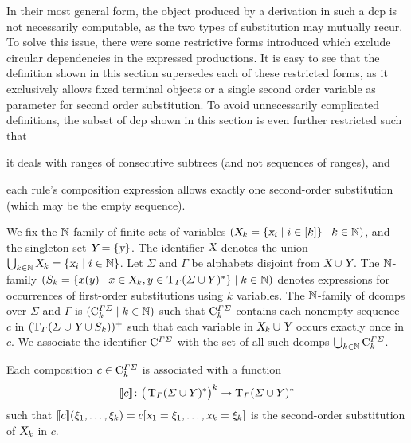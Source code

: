 \documentclass[../document.tex]{subfiles}
\begin{document}
    In their most general form, the object produced by a derivation in such a \gls{dcp} is not necessarily computable, as the two types of substitution may mutually recur.
    To solve this issue, there were some restrictive forms introduced which exclude circular dependencies in the expressed productions. \cite{???}
    It is easy to see that the definition shown in this section supersedes each of these restricted forms, as it exclusively allows fixed terminal objects or a single second order variable as parameter for second order substitution.
    To avoid unnecessarily complicated definitions, the subset of \gls{dcp} shown in this section is even further restricted such that
    \begin{inparaenum}
        \item it deals with ranges of consecutive subtrees (and not sequences of ranges), and
        \item each rule's composition expression allows exactly one second-order substitution (which may be the empty sequence).
    \end{inparaenum}

    \begin{definition}[Composition]
        We fix the \(\mathbb{N}\)-\gls{family} of finite sets of variables \((\textsl{X}_k = \{\textsl{x}_i \mid i \in [k]\} \mid k \in \mathbb{N})\), and the singleton set \(\textsl{Y} = \{\textsl{y}\}\).
        The identifier \(\textsl{X}\) denotes the union \(\bigcup_{k \in \mathbb{N}} \textsl{X}_k = \{\textsl{x}_i \mid i \in \mathbb{N}\}\).
        Let \(\varSigma\) and \(\varGamma\) be alphabets disjoint from \(\textsl{X} \cup \textsl{Y}\).
        The \(\mathbb{N}\)-\gls{family} \((S_k = \{x(y) \mid x \in \textsl{X}_k, y \in \operatorname{T}_\varGamma(\varSigma \cup Y)^*\} \mid k \in \mathbb{N})\) denotes expressions for occurrences of first-order substitutions using \(k\) variables.
        The \(\mathbb{N}\)-\gls{family} of \glspl{dcomp} over \(\varSigma\) and \(\varGamma\) is \((\mathrm{C}^{\varGamma\varSigma}_k \mid k \in \mathbb{N})\) such that \(\mathrm{C}^{\varGamma\varSigma}_k\) contains each nonempty sequence \(c\) in \((\operatorname{T}_\varGamma(\varSigma \cup \textsl{Y} \cup S_k))^+\) such that each variable in \(\textsl{X}_k \cup \textsl{Y}\) occurs exactly once in \(c\).
        We associate the identifier \(\mathrm{C}^{\varGamma\varSigma}\) with the set of all such \glspl*{dcomp} \(\bigcup_{k \in \mathbb{N}} \mathrm{C}^{\varGamma\varSigma}_{k}\).

        Each composition \(c \in \mathrm{C}^{\varGamma\varSigma}_k\) is associated with a function \[
            \llbracket c\rrbracket\colon \big(\operatorname{T}_\varGamma(\varSigma \cup Y)^*\big)^k \to \operatorname{T}_\varGamma(\varSigma \cup Y)^*
        \] such that \(\llbracket c\rrbracket(\xi_1, \ldots, \xi_k) = c[\textsl{x}_1=\xi_1, \ldots, \textsl{x}_k=\xi_k]\) is the second-order substitution of \(\textsl{X}_k\) in \(c\).
    \end{definition}
\end{document}
